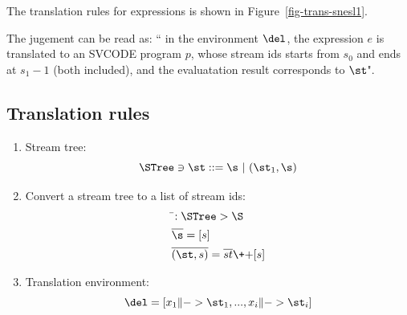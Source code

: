 %	
The translation rules for \mysnesl expressions is shown in Figure~\ref{fig-trans-snesl1}. 

The jugement can be read as: `` in the environment $\del$, the expression $e$ is translated to an SVCODE program $p$, whose stream ids starts from $s_0$ and ends at $s_1-1$ (both included), and the evaluatation result corresponds to $\st$". 

\subsection{Translation rules}
\begin{enumerate}[(1)]
	\item Stream tree: $$ \STree \ni \st ::= \s \ | \ (\st_1,\s) $$
	\item Convert a stream tree to a list of  stream ids:
	\begin{align*}
	&\bar{}: \STree \-> \S \\
	&\overline{\s} = [s] \\
	&\overline{(\st,s)} = \overline{st} {\++} [s]
	\end{align*}
	
	
	\item Translation environment: $$\del = [x_1 \|-> \st_1,..., x_i \|-> {\st_i}] $$ 
	
	
\end{enumerate}

